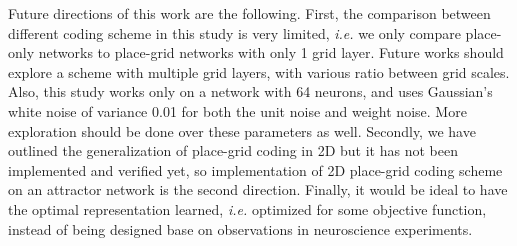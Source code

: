 Future directions of this work are the following. First, the comparison between different coding scheme in this study is very limited, \textit{i.e.} we only compare place-only networks to place-grid networks with only 1 grid layer. Future works should explore a scheme with multiple grid layers, with various ratio between grid scales. Also, this study works only on a network with 64 neurons, and uses Gaussian's white noise of variance 0.01 for both the unit noise and weight noise. More exploration should be done over these parameters as well. Secondly, we have outlined the generalization of place-grid coding in 2D but it has not been implemented and verified yet, so implementation of 2D place-grid coding scheme on an attractor network is the second direction. Finally, it would be ideal to have the optimal representation learned, \textit{i.e.} optimized for some objective function, instead of being designed base on observations in neuroscience experiments.



